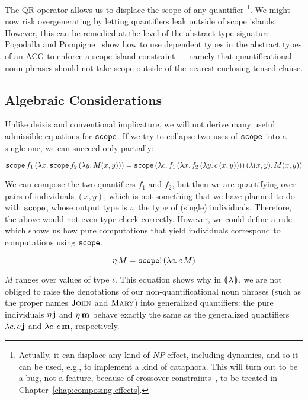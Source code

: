The QR operator allows us to displace the scope of any quantifier
\footnote{Actually, it can displace any kind of $NP$ effect, including
  dynamics, and so it can be used, e.g., to implement a kind of
  cataphora. This will turn out to be a bug, not a feature, because of
  crossover constraints~\cite{shan2006explaining}, to be treated in
  Chapter~\ref{chap:composing-effects}.}. We might now risk overgenerating
by letting quantifiers leak outside of scope islands. However, this can be
remedied at the level of the abstract type signature. Pogodalla and
Pompigne~\cite{pogodalla2012controlling} show how to use dependent types in
the abstract types of an ACG to enforce a scope island constraint ---
namely that quantificational noun phrases should not take scope outside of
the nearest enclosing tensed clause.


\subsection{Algebraic Considerations}
\label{ssec:algebraic-quantification}

Unlike deixis and conventional implicature, we will not derive many useful
admissible equations for $\mathtt{scope}$. If we try to collapse two uses of
$\mathtt{scope}$ into a single one, we can succeed only partially:

$$
\mathtt{scope}\,f_1\,(\lambda x.\, \mathtt{scope}\,f_2\,(\lambda y.\, M(x,y)))
= \mathtt{scope}\,(\lambda c.\, f_1\,(\lambda x.\, f_2\,(\lambda y.\, c\,(x,y))))\,(\lambda (x,y).\, M(x,y))
$$

We can compose the two quantifiers $f_1$ and $f_2$, but then we are
quantifying over pairs of individuals $(x,y)$, which is not something that
we have planned to do with $\mathtt{scope}$, whose output type is $\iota$, the
type of (single) individuals. Therefore, the above would not even
type-check correctly. However, we could define a rule which shows us how
pure computations that yield individuals correspond to computations using
$\mathtt{scope}$.

$$
\eta\,M = \mathtt{scope}!\,(\lambda c.\, c\,M)
$$

$M$ ranges over values of type $\iota$. This equation shows why in
$\llparenthesis \, \lambda \, \rrparenthesis$, we are not obliged to raise the denotations of our
non-quantificational noun phrases (such as the proper names $\textsc{John}$
and $\textsc{Mary}$) into generalized quantifiers: the pure individuals
$\eta\,\textbf{j}$ and $\eta\,\textbf{m}$ behave exactly the same as the
generalized quantifiers $\lambda c.\, c\,\textbf{j}$ and
$\lambda c.\, c\,\textbf{m}$, respectively.

